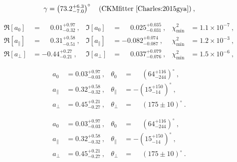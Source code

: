 \begin{equation}\label{Eq:Gamma_GC}
\gamma  = \left(73.2_{-7.0}^{+6.3}\right)^{\circ} \quad\text{(CKMfitter \cite{Charles:2015gya})}\:,
\end{equation}

\begin{align}
\Re[a_0] & = \phantom{-}0.01_{-0.32}^{+0.97}\:, & \Im[a_0] & = \phantom{-}0.025_{-0.031}^{+0.035}\:, & \chi^2_{\text{min}} & = 1.1 \times 10^{-7}\:,\label{Eq:Pen_Re_Im_Long}\\
%
\Re[a_\parallel] & = \phantom{-}0.31_{-0.51}^{+0.58}\:, & \Im[a_\parallel] & = -0.082_{-0.087}^{+0.074}\:,& \chi^2_{\text{min}} & = 1.2 \times 10^{-3}\:,\label{Eq:Pen_Re_Im_Para}\\
%
\Re[a_\perp] & = -0.44_{-0.21}^{+0.27}\:, & \Im[a_\perp] & = \phantom{-}0.037_{-0.076}^{+0.079}\:,& \chi^2_{\text{min}} & = 1.5 \times 10^{-6}\:,\label{Eq:Pen_Re_Im_Perp}
\end{align}

\begin{align}
a_0 & = 0.03^{+0.97}_{-0.03}\:, & \theta_0 & = \phantom{-}\left(64^{+116}_{-244}\right)^{\circ}\:,\\
%
a_\parallel & = 0.32^{+0.58}_{-0.32}\:, & \theta_\parallel & = -\left(15^{+150}_{-14}\right)^{\circ}\:,\\
%
a_\perp & = 0.45^{+0.21}_{-0.27}\:, & \theta_\perp & = \phantom{-}\left(175 \pm 10\right)^{\circ}\:.
\end{align}

\begin{align}
a_0 & = 0.03^{+0.97}_{-0.03}\:, & \theta_0 & = \phantom{-}\left(64^{+116}_{-244}\right)^{\circ}\:,\\
%
a_\parallel & = 0.32^{+0.58}_{-0.32}\:, & \theta_\parallel & = -\left(15^{+150}_{-14}\right)^{\circ}\:,\\
%
a_\perp & = 0.45^{+0.21}_{-0.27}\:, & \theta_\perp & = \phantom{-}\left(175 \pm 10\right)^{\circ}\:.
\end{align}


